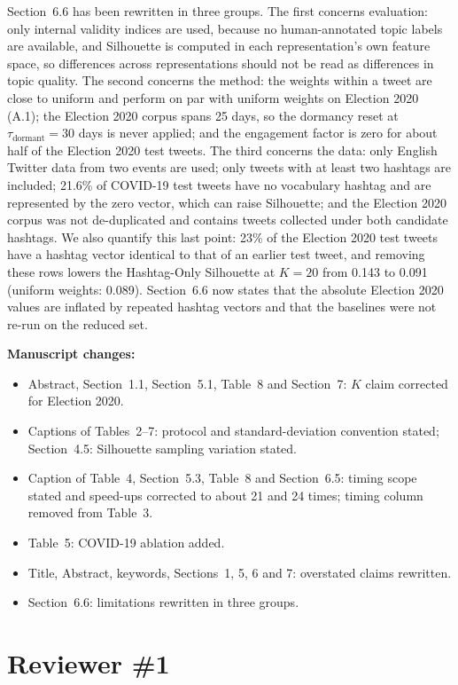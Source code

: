 \documentclass[11pt,a4paper]{article}
\newcommand{\parthead}[1]{\par\medskip\textbf{#1}\par}
\begin{document}
Section~6.6 has been rewritten in three groups. The first concerns evaluation: only internal validity indices are used, because no human-annotated topic labels are available, and Silhouette is computed in each representation's own feature space, so differences across representations should not be read as differences in topic quality. The second concerns the method: the weights within a tweet are close to uniform and perform on par with uniform weights on Election 2020 (A.1); the Election 2020 corpus spans 25 days, so the dormancy reset at $\tau_{\text{dormant}} = 30$ days is never applied; and the engagement factor is zero for about half of the Election 2020 test tweets. The third concerns the data: only English Twitter data from two events are used; only tweets with at least two hashtags are included; 21.6\% of COVID-19 test tweets have no vocabulary hashtag and are represented by the zero vector, which can raise Silhouette; and the Election 2020 corpus was not de-duplicated and contains tweets collected under both candidate hashtags. We also quantify this last point: 23\% of the Election 2020 test tweets have a hashtag vector identical to that of an earlier test tweet, and removing these rows lowers the Hashtag-Only Silhouette at $K = 20$ from 0.143 to 0.091 (uniform weights: 0.089). Section~6.6 now states that the absolute Election 2020 values are inflated by repeated hashtag vectors and that the baselines were not re-run on the reduced set.

\parthead{Manuscript changes:}
\begin{itemize}
\item Abstract, Section~1.1, Section~5.1, Table~8 and Section~7: $K$ claim corrected for Election 2020.
\item Captions of Tables~2--7: protocol and standard-deviation convention stated; Section~4.5: Silhouette sampling variation stated.
\item Caption of Table~4, Section~5.3, Table~8 and Section~6.5: timing scope stated and speed-ups corrected to about 21 and 24 times; timing column removed from Table~3.
\item Table~5: COVID-19 ablation added.
\item Title, Abstract, keywords, Sections~1, 5, 6 and 7: overstated claims rewritten.
\item Section~6.6: limitations rewritten in three groups.
\end{itemize}

\section{Reviewer \#1}
\end{document}
